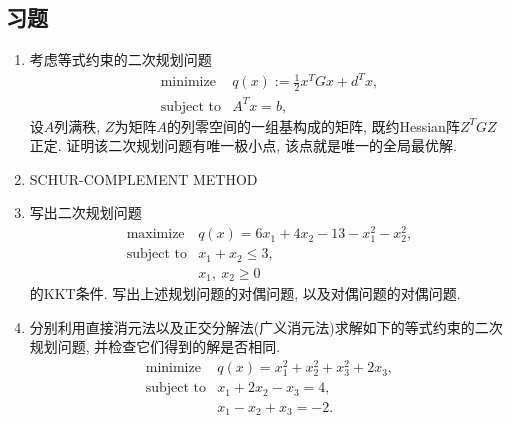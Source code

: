 \documentclass{SBCbookchapter}
\numberwithin{equation}{section}
\begin{document}
\subsection*{习题}

\begin{enumerate}
\item 考虑等式约束的二次规划问题
\begin{equation*}
\begin{array}{cl}
\text{minimize} & q(x) := \frac{1}{2} x^T G x + d^T x, \\
\text{subject to} & A^T x = b,
\end{array}
\end{equation*}
设$A$列满秩, $Z$为矩阵$A$的列零空间的一组基构成的矩阵, 既约Hessian阵$Z^T G Z$正定. 证明该二次规划问题有唯一极小点, 该点就是唯一的全局最优解.

\item SCHUR-COMPLEMENT METHOD

\item 写出二次规划问题
\begin{equation*}
\begin{array}{cl}
\text{maximize} & q(x) = 6x_1 + 4x_2 - 13 - x_1^2 - x_2^2, \\
\text{subject to} & x_1 + x_2 \leqslant 3, \\
& x_1, ~ x_2 \geqslant 0
\end{array}
\end{equation*}
的KKT条件. 写出上述规划问题的对偶问题, 以及对偶问题的对偶问题.

\item 分别利用直接消元法以及正交分解法(广义消元法)求解如下的等式约束的二次规划问题, 并检查它们得到的解是否相同.
\begin{equation*}
\begin{array}{cl}
\text{minimize} & q(x) = x_1^2 + x_2^2 + x_3^2 + 2x_3, \\
\text{subject to} & x_1 + 2x_2 - x_3 = 4, \\
& x_1 - x_2 + x_3 = -2.
\end{array}
\end{equation*}
\end{enumerate}



\end{document}
